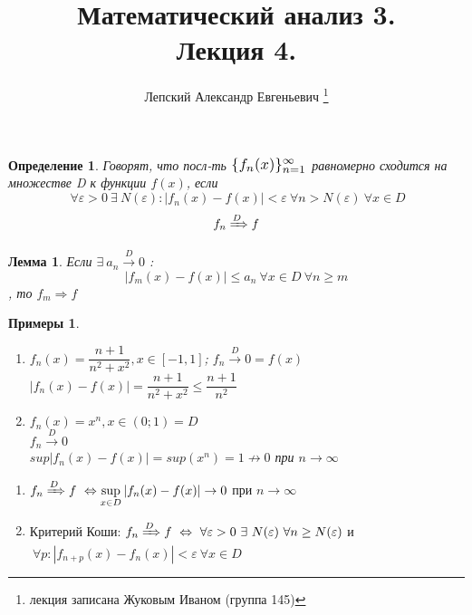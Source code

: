 \documentclass[a4paper, 12pt]{article}
\title{Математический анализ 3.\\Лекция 4.}
\author{Лепский Александр Евгеньевич
        \footnote{лекция записана Жуковым Иваном (группа 145)}}
\newtheorem{Definition}{Определение}
\newtheorem{Lemma}{Лемма}
\newtheorem{Examples}{Примеры}
\begin{document}
    \maketitle
    
    \begin{Definition}
        Говорят, что посл-ть $\scalebox{1.2}{$\{f_n(x)\}^{\infty}_{n = 1}$}$ равномерно сходится
        на множестве D к функции $f(x)$, если\\
        \[\ \forall \varepsilon > 0
        \ \exists \  N(\varepsilon): \left| f_n(x) - f(x) \right|
        < \varepsilon \ \forall n > N(\varepsilon) \ \forall x \in D\]         
        \[f_n \xRightarrow{D} f\]
    \end{Definition}
    \begin{Lemma}
        Если $\exists \ a_n \xrightarrow{D} 0$ :
        \[ \left| f_m(x) - f(x)\right| \le a_n \ \forall x \in D \ \forall n
        \ge m\], то $f_m \Rightarrow f$
    \end{Lemma}
    \begin{Examples}
        \leavevmode
        \begin{enumerate}
            \item
            $f_n(x) = \dfrac{n + 1}{n^2 + x^2}, x \in [-1, 1]$;
            $f_n \xrightarrow{D} 0 = f(x)$\\
            $\left| f_n(x) - f(x)\right| = \dfrac{n + 1}{n^2 + x^2} \le
            \dfrac{n + 1}{n^2}$

            \item
            $f_n(x) = x^n, x \in (0; 1) = D$ \\
            $f_n \xrightarrow{D} 0$ \\
            $sup \left| f_n(x) - f(x) \right| = sup(x^n) = 1 \not \rightarrow 0$
            при $n \rightarrow \infty$

        \end{enumerate}
    \end{Examples}

    \begin{enumerate}
        \item 
        $f_n \xRightarrow{D} f \ \Leftrightarrow \underset{x \in D}{\sup}
        \left| f_n(x) - f(x)\right| \rightarrow 0$  при $n \rightarrow \infty$

        \item
        Критерий Коши:
        $f_n \xRightarrow{D} f \ \Leftrightarrow \ \forall \varepsilon > 0
        \ \exists \ N(\varepsilon) \ \forall n \ge N(\varepsilon)$ и\\
        $\ \forall p: \left| f_{n + p}(x) - f_n(x) \right| <
        \varepsilon \ \forall x \in D$ 
    \end{enumerate}
\end{document}
